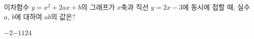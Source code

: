 이차함수 $y=x^2+2ax+b$의 그래프가 $x$축과 직선 $y=2x-3$에 동시에 접할 때, 실수 $a$, $b$에 대하여 $ab$의 값은?
\begin{choices32}{$-2$}{$-1$}{$1$}{$2$}{$4$}\end{choices32}
